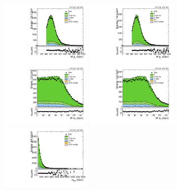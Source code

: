 \begin{figure}[htbp]
  \centering
  \includegraphics[width=0.4\textwidth]{fig/controlPlots/CR_b1_mu_allP_allC_allE_Run2_lnujj_l1_pt.pdf}
  \includegraphics[width=0.4\textwidth]{fig/controlPlots/CR_b1_e_allP_allC_allE_Run2_lnujj_l1_pt.pdf}\\
  \includegraphics[width=0.4\textwidth]{fig/controlPlots/CR_b1_mu_allP_allC_allE_Run2_lnujj_l1_mt.pdf}
  \includegraphics[width=0.4\textwidth]{fig/controlPlots/CR_b1_e_allP_allC_allE_Run2_lnujj_l1_mt.pdf}\\
  \includegraphics[width=0.4\textwidth]{fig/controlPlots/CR_b1_mu_allP_allC_allE_Run2_mWV.pdf}

\end{figure}
